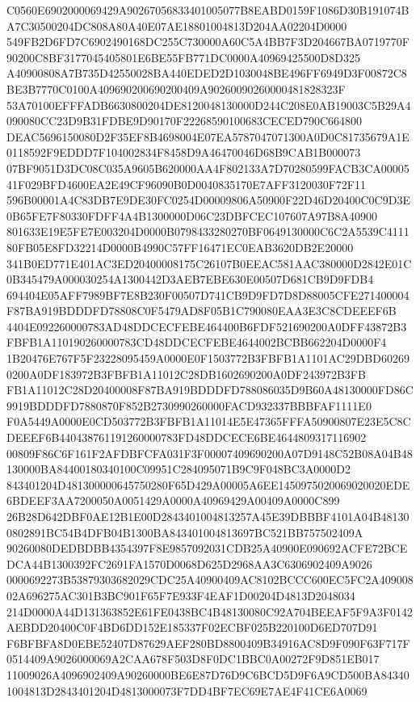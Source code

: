 \documentclass[UTF8,fontset=fandol,zihao=-4,a4paper]{ctexart}
\begin{document}
{{C0560E6902000069429A90267056833401005077B8EABD0159F1086D30B191074BA7C30500204DC808A80A40E07AE18801004813D204AA02204D0000
549FB2D6FD7C6902490168DC255C730000A60C5A4BB7F3D204667BA0719770F90200C8BF3177045405801E6BE55FB771DC0000A40969425500D8D325
A40900808A7B735D42550028BA440EDED2D1030048BE496FF6949D3F00872C8BE3B7770C0100A409690200690200409A90260090260000481828323F
53A70100EFFFADB6630800204DE8120048130000D244C208E0AB19003C5B29A4090080CC23D9B31FDBE9D90170F22268590100683CECED790C664800
DEAC5696150080D2F35EF8B4698004E07EA5787047071300A0D0C81735679A1E0118592F9EDDD7F104002834F8458D9A46470046D68B9CAB1B000073
07BF9051D3DC08C035A9605B620000AA4F802133A7D70280599FACB3CA0000541F029BFD4600EA2E49CF96090B0D0040835170E7AFF3120030F72F11
596B00001A4C83DB7E9DE30FC0254D00009806A50900F22D46D20400C0C9D3E0B65FE7F80330FDFF4A4B1300000D06C23DBFCEC107607A97B8A40900
801633E19E5FE7E003204D0000B0798433280270BF0649130000C6C2A5539C411180FB05E8FD32214D0000B4990C57FF16471EC0EAB3620DB2E20000
341B0ED771E401AC3ED20400008175C26107B0EEAC581AAC380000D2842E01C0B345479A000030254A1300442D3AEB7EBE630E00507D681CB9D9FDB4
694404E05AFF7989BF7E8B230F00507D741CB9D9FD7D8D88005CFE271400004F87BA919BDDDFD78808C0F5479AD8F05B1C790080EAA3E3C8CDEEEF6B
4404E092260000783AD48DDCECFEBE464400B6FDF521690200A0DFF43872B3FBFB1A110190260000783CD48DDCECFEBE4644002BCBB662204D0000F4
1B20476E767F5F23228095459A0000E0F1503772B3FBFB1A1101AC29DBD602690200A0DF183972B3FBFB1A11012C28DB1602690200A0DF243972B3FB
FB1A11012C28D20400008F87BA919BDDDFD788086035D9B60A48130000FD86C9919BDDDFD7880870F852B2730990260000FACD932337BBBFAF1111E0
F0A5449A0000E0CD503772B3FBFB1A11014E5E47365FFFA50900807E23E5C8CDEEEF6B440438761191260000783FD48DDCECE6BE4644809317116902
00809F86C6F161F2AFDBFCFA031F3F00007409690200A07D9148C52B08A04B48130000BA84400180340100C09951C284095071B9C9F048BC3A0000D2
843401204D481300000645750280F65D429A00005A6EE1450975020069020020EDE6BDEEF3AA7200050A0051429A0000A40969429A00409A0000C899
26B28D642DBF0AE12B1E00D2843401004813257A45E39DBBBF4101A04B481300802891BC54B4DFB04B1300BA843401004813697BC521BB757502409A
90260080DEDBDBB4354397F8E9857092031CDB25A40900E090692ACFE72BCEDCA44B1300392FC2691FA1570D0068D625D2968AA3C6306902409A9026
0000692273B53879303682029CDC25A40900409AC8102BCCC600EC5FC2A40900802A696275AC301B3BC901F65F7E933F4EAF1D00204D4813D2048034
214D0000A44D131363852E61FE0438BC4B48130080C92A704BEEAF5F9A3F0142AEBDD20400C0F4BD6DD152E185337F02ECBF025B220100D6ED707D91
F6BFBFA8D0EBE52407D87629AEF280BD8800409B34916AC8D9F090F63F717F0514409A9026000069A2CAA678F503D8F0DC1BBC0A00272F9D851EB017
11009026A4096902409A90260000BE6E87D76D9C6BCD5D9F6A9CD500BA843401004813D2843401204D4813000073F7DD4BF7EC69E7AE4F41CE6A0069
}}
\end{document}
